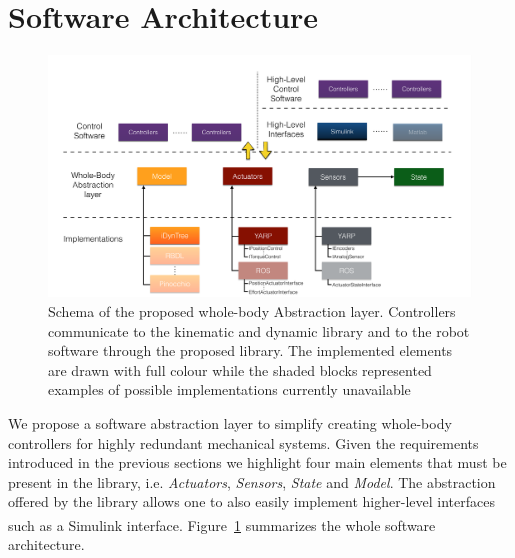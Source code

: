 \section{Software Architecture} %
\label{sec:software_architecture}

\begin{figure}[t]
  \centering
    \includegraphics[width=\textwidth]{figs/WBI_diagram}
  \caption{Schema of the proposed whole-body Abstraction layer. Controllers communicate to the kinematic and dynamic library and to the robot software through the proposed library. The implemented elements are drawn with full colour while the shaded blocks represented examples of possible implementations currently unavailable}
  \label{fig:sw_architecture}
\end{figure}


We propose a software abstraction layer to simplify creating whole-body controllers for highly redundant mechanical systems.
Given the requirements introduced in the previous sections we highlight four main elements that must be present in the library, i.e. \emph{Actuators}, \emph{Sensors},  \emph{State} and \emph{Model}.
The abstraction offered by the library allows one to also easily implement higher-level interfaces such as a Simulink\textsuperscript{\textregistered} interface.
Figure~\ref{fig:sw_architecture} summarizes the whole software architecture.


